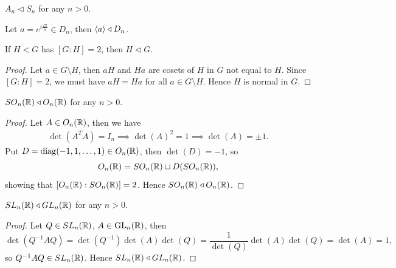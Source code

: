 \begin{example}
  \(A_n\lhd S_n\) for any \(n > 0\).
\end{example}

\begin{example}
  Let \(a = e^{i\frac{2\pi}{n}}\in D_n\), then \(\langle a\rangle\triangleleft D_n\).
\end{example}
\begin{proposition}
  If \(H < G\) has \([G:H] = 2\), then \(H\lhd G\).
\end{proposition}
\begin{proof}
  Let \(a\in G\setminus H\), then \(aH\) and \(Ha\) are cosets of \(H\) in \(G\) not equal to \(H\). Since \([G:H] = 2\), we must have \(aH = Ha\) for all \(a\in G\setminus H\). Hence \(H\) is normal in \(G\).
\end{proof}

\begin{example}
  \(SO_n(\mathbb{R})\triangleleft O_n(\mathbb{R})\) for any \(n > 0\).
\end{example}
\begin{proof}
  Let \(A\in O_n(\mathbb{R})\), then we have \begin{align*}
    \det(A^TA) = I_n \implies \det(A)^2 = 1 \implies \det(A) = \pm 1.
  \end{align*}
  Put \(D = \operatorname{diag}(-1,1,\ldots,1)\in O_n(\mathbb{R})\), then \(\det(D) = -1\), so \[
    O_n(\mathbb{R}) = SO_n(\mathbb{R})\sqcup D(SO_n(\mathbb{R})),
  \] showing that \([O_n(\mathbb{R}):SO_n(\mathbb{R})] = 2\). Hence \(SO_n(\mathbb{R})\triangleleft O_n(\mathbb{R})\).
\end{proof}

\begin{example}
  \(SL_n(\mathbb{R})\triangleleft GL_n(\mathbb{R})\) for any \(n > 0\).
\end{example}
\begin{proof}
  Let \(Q\in SL_n(\mathbb{R})\), \(A\in\operatorname{GL}_n(\mathbb{R})\), then \[
    \det(Q^{-1}AQ) = \det(Q^{-1})\det(A)\det(Q) = \frac{1}{\det(Q)}\det(A)\det(Q) = \det(A) = 1,
  \] so \(Q^{-1}AQ\in SL_n(\mathbb{R})\). Hence \(SL_n(\mathbb{R})\triangleleft GL_n(\mathbb{R})\).
\end{proof}

